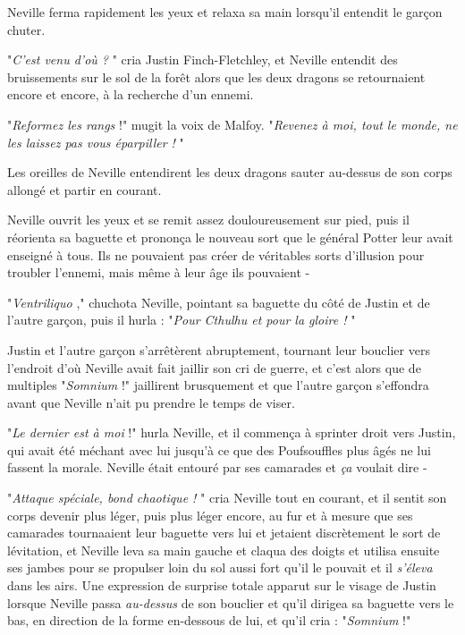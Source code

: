 Neville ferma rapidement les yeux et relaxa sa main lorsqu'il entendit le garçon chuter.

"\emph{C'est venu d'où ?} " cria Justin Finch-Fletchley, et Neville entendit des bruissements sur le sol de la forêt alors que les deux dragons se retournaient encore et encore, à la recherche d'un ennemi.

"\emph{Reformez les rangs}  !" mugit la voix de Malfoy. "\emph{Revenez à moi, tout le monde, ne les laissez pas vous éparpiller !} "

Les oreilles de Neville entendirent les deux dragons sauter au-dessus de son corps allongé et partir en courant.

Neville ouvrit les yeux et se remit assez douloureusement sur pied, puis il réorienta sa baguette et prononça le nouveau sort que le général Potter leur avait enseigné à tous. Ils ne pouvaient pas créer de véritables sorts d'illusion pour troubler l'ennemi, mais même à leur âge ils pouvaient -

"\emph{Ventriliquo} ," chuchota Neville, pointant sa baguette du côté de Justin et de l'autre garçon, puis il hurla : "\emph{Pour Cthulhu et pour la gloire !} "

Justin et l'autre garçon s'arrêtèrent abruptement, tournant leur bouclier vers l'endroit d'où Neville avait fait jaillir son cri de guerre, et c'est alors que de multiples "\emph{Somnium}  !" jaillirent brusquement et que l'autre garçon s'effondra avant que Neville n'ait pu prendre le temps de viser.

"\emph{Le dernier est à moi}  !" hurla Neville, et il commença à sprinter droit vers Justin, qui avait été méchant avec lui jusqu'à ce que des Poufsouffles plus âgés ne lui fassent la morale. Neville était entouré par ses camarades et \emph{ça}  voulait dire -

"\emph{Attaque spéciale, bond chaotique !} " cria Neville tout en courant, et il sentit son corps devenir plus léger, puis plus léger encore, au fur et à mesure que ses camarades tournaaient leur baguette vers lui et jetaient discrètement le sort de lévitation, et Neville leva sa main gauche et claqua des doigts et utilisa ensuite ses jambes pour se propulser loin du sol aussi fort qu'il le pouvait et il \emph{s'éleva}  dans les airs. Une expression de surprise totale apparut sur le visage de Justin lorsque Neville passa \emph{au-dessus}  de son bouclier et qu'il dirigea sa baguette vers le bas, en direction de la forme en-dessous de lui, et qu'il cria : "\emph{Somnium}  !"

